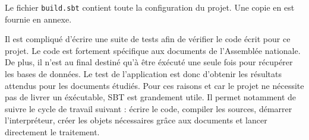Le fichier \verb|build.sbt| contient toute la configuration du projet. Une copie en est fournie en annexe.

Il est compliqué d'écrire une suite de tests afin de vérifier le code écrit pour ce projet. Le code est fortement spécifique aux documents de l'Assemblée nationale. De plus, il n'est au final destiné qu'à être éxécuté une seule fois pour récupérer les bases de données. Le test de l'application est donc d'obtenir les résultats attendus pour les documents étudiés.\newline
Pour ces raisons et car le projet ne nécessite pas de livrer un éxécutable, SBT est grandement utile. Il permet notamment de suivre le cycle de travail suivant : écrire le code, compiler les sources, démarrer l'interpréteur, créer les objets nécessaires grâce aux documents et lancer directement le traitement.
